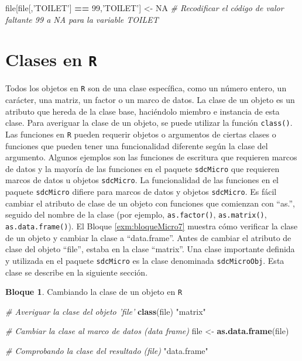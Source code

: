 \documentclass[]{book}
\newenvironment{Shaded}{\begin{snugshade}}{\end{snugshade}}
\newcommand{\CommentTok}[1]{\textcolor[rgb]{0.56,0.35,0.01}{\textit{#1}}}
\newcommand{\DecValTok}[1]{\textcolor[rgb]{0.00,0.00,0.81}{#1}}
\newcommand{\KeywordTok}[1]{\textcolor[rgb]{0.13,0.29,0.53}{\textbf{#1}}}
\newcommand{\NormalTok}[1]{#1}
\newcommand{\OperatorTok}[1]{\textcolor[rgb]{0.81,0.36,0.00}{\textbf{#1}}}
\newcommand{\OtherTok}[1]{\textcolor[rgb]{0.56,0.35,0.01}{#1}}
\newcommand{\StringTok}[1]{\textcolor[rgb]{0.31,0.60,0.02}{#1}}
\theoremstyle{definition}
\theoremstyle{definition}
\newtheorem{example}{Bloque}[chapter]
\theoremstyle{definition}
\theoremstyle{definition}
\theoremstyle{remark}
\begin{document}
\begin{Shaded}
\begin{Highlighting}[]
\NormalTok{file[file[,}\StringTok{'TOILET'}\NormalTok{] }\OperatorTok{==}\StringTok{ }\DecValTok{99}\NormalTok{,}\StringTok{'TOILET'}\NormalTok{] <-}\StringTok{ }\OtherTok{NA}
\CommentTok{# Recodificar el código de valor faltante 99 a NA para la variable TOILET}
\end{Highlighting}
\end{Shaded}

\hypertarget{clases-en-r}{%
\section{\texorpdfstring{Clases en \texttt{R}}{Clases en R}}\label{clases-en-r}}

Todos los objetos en \texttt{R} son de una clase específica, como un número entero, un carácter, una matriz, un factor o un marco de datos. La clase de un objeto es un atributo que hereda de la clase base, haciéndolo miembro e instancia de esta clase. Para averiguar la clase de un objeto, se puede utilizar la función \texttt{class()}. Las funciones en \texttt{R} pueden requerir objetos o argumentos de ciertas clases o funciones que pueden tener una funcionalidad diferente según la clase del argumento. Algunos ejemplos son las funciones de escritura que requieren marcos de datos y la mayoría de las funciones en el paquete \texttt{sdcMicro} que requieren marcos de datos u objetos \texttt{sdcMicro}. La funcionalidad de las funciones en el paquete \texttt{sdcMicro} difiere para marcos de datos y objetos \texttt{sdcMicro}. Es fácil cambiar el atributo de clase de un objeto con funciones que comienzan con ``as.'', seguido del nombre de la clase (por ejemplo, \texttt{as.factor()}, \texttt{as.matrix()}, \texttt{as.data.frame()}). El Bloque \ref{exm:bloqueMicro7} muestra cómo verificar la clase de un objeto y cambiar la clase a ``data.frame''. Antes de cambiar el atributo de clase del objeto ``file'', estaba en la clase ``matrix''. Una clase importante definida y utilizada en el paquete \texttt{sdcMicro} es la clase denominada \texttt{sdcMicroObj}. Esta clase se describe en la siguiente sección.

\begin{example}
\protect\hypertarget{exm:bloqueMicro7}{}{\label{exm:bloqueMicro7} }Cambiando la clase de un objeto en \texttt{R}
\end{example}

\begin{Shaded}
\begin{Highlighting}[]
\CommentTok{# Averiguar la clase del objeto 'file'}
\KeywordTok{class}\NormalTok{(file)}
\StringTok{"matrix"}

\CommentTok{# Cambiar la clase al marco de datos (data frame)}
\NormalTok{file <-}\StringTok{ }\KeywordTok{as.data.frame}\NormalTok{(file)}

\CommentTok{# Comprobando la clase del resultado (file)}
\StringTok{"data.frame"}
\end{Highlighting}
\end{Shaded}
\end{document}
